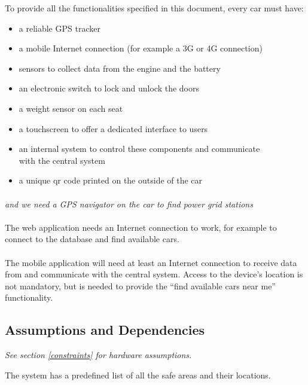 \documentclass[english]{article}
\begin{document}
To provide all the functionalities specified in this document, every car must have:
\begin{itemize}
	\item{a reliable GPS tracker}
	\item{a mobile Internet connection (for example a 3G or 4G connection)}
	\item{sensors to collect data from the engine and the battery}
	\item{an electronic switch to lock and unlock the doors}
	\item{a weight sensor on each seat}
	\item{a touchscreen to offer a dedicated interface to users}
	\item{an internal system to control these components and communicate\\ with the central system}
	\item{a unique qr code printed on the outside of the car}
\end{itemize}

\paragraph{}
\emph{and we need a GPS navigator on the car to find power grid stations}

\paragraph{}
The web application needs an Internet connection to work, for example to connect to the database and find available cars.

\paragraph{}
The mobile application will need at least an Internet connection to receive data from and communicate with the central system. Access to the device’s location is not mandatory, but is needed to provide the “find available cars near me” functionality.

\subsection{Assumptions and Dependencies}

\emph{See section \ref{constraints} for hardware assumptions.}


The system has a predefined list of all the safe areas and their locations.
\end{document}
